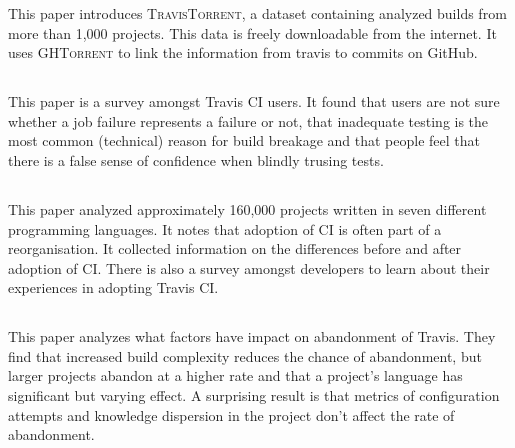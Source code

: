 \documentclass[]{book}
\begin{document}
This paper introduces \textsc{TravisTorrent}, a dataset containing
analyzed builds from more than 1,000 projects. This data is freely
downloadable from the internet. It uses \textsc{GHTorrent} to link the
information from travis to commits on GitHub.

\subsection{\texorpdfstring{\citet{pinto2018work}}{@pinto2018work}}\label{pinto2018work}

This paper is a survey amongst Travis CI users. It found that users are
not sure whether a job failure represents a failure or not, that
inadequate testing is the most common (technical) reason for build
breakage and that people feel that there is a false sense of confidence
when blindly trusing tests.

\subsection{\texorpdfstring{\citet{zhao2017impact}}{@zhao2017impact}}\label{zhao2017impact}

This paper analyzed approximately 160,000 projects written in seven
different programming languages. It notes that adoption of CI is often
part of a reorganisation. It collected information on the differences
before and after adoption of CI. There is also a survey amongst
developers to learn about their experiences in adopting Travis CI.

\subsection{\texorpdfstring{\citet{widder2018m}}{@widder2018m}}\label{widder2018m}

This paper analyzes what factors have impact on abandonment of Travis.
They find that increased build complexity reduces the chance of
abandonment, but larger projects abandon at a higher rate and that a
project's language has significant but varying effect. A surprising
result is that metrics of configuration attempts and knowledge
dispersion in the project don't affect the rate of abandonment.

\subsection{\texorpdfstring{\citet{hilton2018usage}}{@hilton2018usage}}\label{hilton2018usage}
\end{document}
